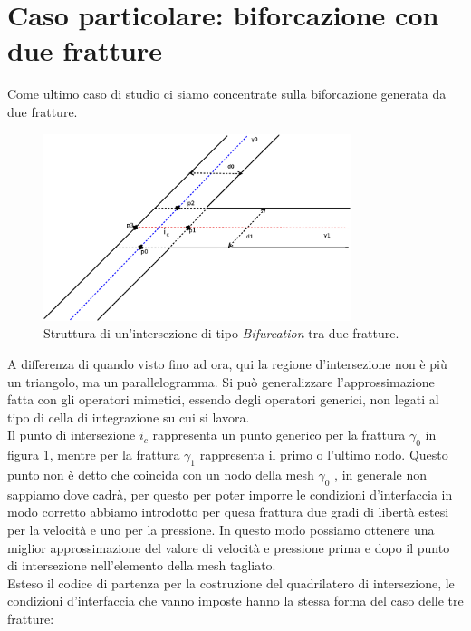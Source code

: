 \section{Caso particolare: biforcazione con due fratture}

Come ultimo caso di studio ci siamo concentrate sulla biforcazione generata da due fratture. 

\begin{figure}[htbp]
\begin{center}
\includegraphics[width=0.8\textwidth]{img/cap6/y.eps}
\caption{Struttura di un'intersezione di tipo \textit{Bifurcation} tra due fratture.}\label{Y}
\end{center}
\end{figure}

A differenza di quando visto fino ad ora, qui la regione d'intersezione non è più un triangolo, ma un parallelogramma. Si può generalizzare l'approssimazione fatta con gli operatori mimetici, essendo degli operatori generici, non legati al tipo di cella di integrazione su cui si lavora. \\
\noindent Il punto di intersezione $i_c$ rappresenta un punto generico per la frattura $\gamma_0$ in figura \ref{Y}, mentre per la frattura $\gamma_1$ rappresenta il primo o l'ultimo nodo. Questo punto non è detto che coincida con un nodo della mesh $\gamma_0$ , in generale non sappiamo dove cadrà, per questo per poter imporre le condizioni d'interfaccia in modo corretto abbiamo introdotto per quesa frattura due gradi di libertà estesi per la velocità e uno per la pressione. In questo modo possiamo ottenere una miglior approssimazione del valore di velocità e pressione prima e dopo il punto di intersezione nell'elemento della mesh tagliato. \\
Esteso il codice di partenza per la costruzione del quadrilatero di intersezione, le condizioni d'interfaccia che vanno imposte hanno la stessa forma del caso delle tre fratture:

